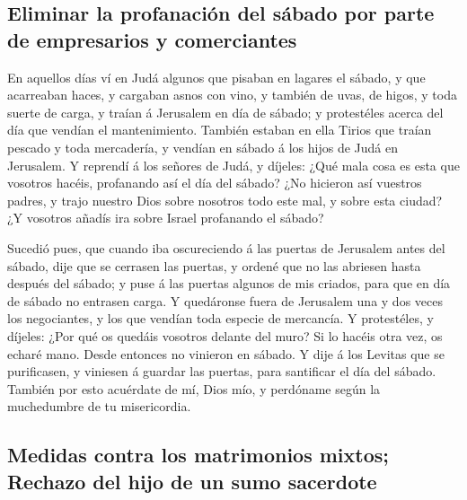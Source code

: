\hypertarget{eliminar-la-profanaciuxf3n-del-suxe1bado-por-parte-de-empresarios-y-comerciantes}{%
\subsection{Eliminar la profanación del sábado por parte de empresarios
y
comerciantes}\label{eliminar-la-profanaciuxf3n-del-suxe1bado-por-parte-de-empresarios-y-comerciantes}}

 En aquellos días ví en Judá algunos que pisaban en
lagares el sábado, y que acarreaban haces, y cargaban asnos con vino, y
también de uvas, de higos, y toda suerte de carga, y traían á Jerusalem
en día de sábado; y protestéles acerca del día que vendían el
mantenimiento.  También estaban en ella Tirios que traían
pescado y toda mercadería, y vendían en sábado á los hijos de Judá en
Jerusalem.  Y reprendí á los señores de Judá, y díjeles:
¿Qué mala cosa es esta que vosotros hacéis, profanando así el día del
sábado?  ¿No hicieron así vuestros padres, y trajo
nuestro Dios sobre nosotros todo este mal, y sobre esta ciudad? ¿Y
vosotros añadís ira sobre Israel profanando el sábado?

 Sucedió pues, que cuando iba oscureciendo á las puertas
de Jerusalem antes del sábado, dije que se cerrasen las puertas, y
ordené que no las abriesen hasta después del sábado; y puse á las
puertas algunos de mis criados, para que en día de sábado no entrasen
carga.  Y quedáronse fuera de Jerusalem una y dos veces
los negociantes, y los que vendían toda especie de mercancía.
 Y protestéles, y díjeles: ¿Por qué os quedáis vosotros
delante del muro? Si lo hacéis otra vez, os echaré mano. Desde entonces
no vinieron en sábado.  Y dije á los Levitas que se
purificasen, y viniesen á guardar las puertas, para santificar el día
del sábado. También por esto acuérdate de mí, Dios mío, y perdóname
según la muchedumbre de tu misericordia.

\hypertarget{medidas-contra-los-matrimonios-mixtos-rechazo-del-hijo-de-un-sumo-sacerdote}{%
\subsection{Medidas contra los matrimonios mixtos; Rechazo del hijo de
un sumo
sacerdote}\label{medidas-contra-los-matrimonios-mixtos-rechazo-del-hijo-de-un-sumo-sacerdote}}

